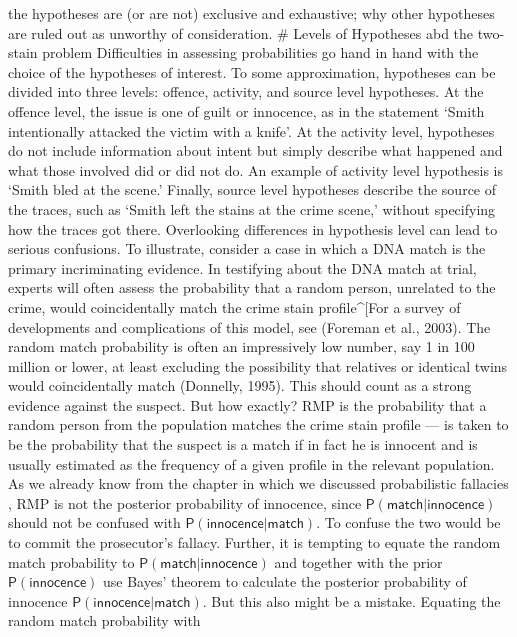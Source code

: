 \documentclass[10pt,dvipsnames,enabledeprecatedfontcommands]{scrartcl}
\newcommand{\pr}[1]{\mathsf{P}(#1)}
\begin{document}
the hypotheses are (or are not) exclusive and exhaustive; why other
hypotheses are ruled out as unworthy of consideration. \# Levels of
Hypotheses abd the two-stain problem Difficulties in assessing
probabilities go hand in hand with the choice of the hypotheses of
interest. To some approximation, hypotheses can be divided into three
levels: offence, activity, and source level hypotheses. At the offence
level, the issue is one of guilt or innocence, as in the statement
`Smith intentionally attacked the victim with a knife'. At the activity
level, hypotheses do not include information about intent but simply
describe what happened and what those involved did or did not do. An
example of activity level hypothesis is `Smith bled at the scene.'
Finally, source level hypotheses describe the source of the traces, such
as `Smith left the stains at the crime scene,' without specifying how
the traces got there. Overlooking differences in hypothesis level can
lead to serious confusions. To illustrate, consider a case in which a
DNA match is the primary incriminating evidence. In testifying about the
DNA match at trial, experts will often assess the probability that a
random person, unrelated to the crime, would coincidentally match the
crime stain profile\^{}{[}For a survey of developments and complications
of this model, see (Foreman et al., 2003). The random match probability
is often an impressively low number, say 1 in 100 million or lower, at
least excluding the possibility that relatives or identical twins would
coincidentally match (Donnelly, 1995). This should count as a strong
evidence against the suspect. But how exactly? RMP is the probability
that a random person from the population matches the crime stain profile
--- is taken to be the probability that the suspect is a match if in
fact he is innocent and is usually estimated as the frequency of a given
profile in the relevant population. As we already know from the chapter
in which we discussed probabilistic fallacies , RMP is
not the posterior probability of innocence, since
\(\pr{\textsf{match} \vert \textsf{innocence}}\) should not be confused
with \(\pr{\textsf{innocence} \vert \textsf{match}}\). To confuse the
two would be to commit the prosecutor's fallacy. Further, it is tempting
to equate the random match probability to
\(\pr{\textsf{match} \vert \textsf{innocence}}\) and together with the
prior \(\pr{\textsf{innocence}}\) use Bayes' theorem to calculate the
posterior probability of innocence
\(\pr{\textsf{innocence} \vert \textsf{match}}\). But this also might be
a mistake. Equating the random match probability with
\end{document}
